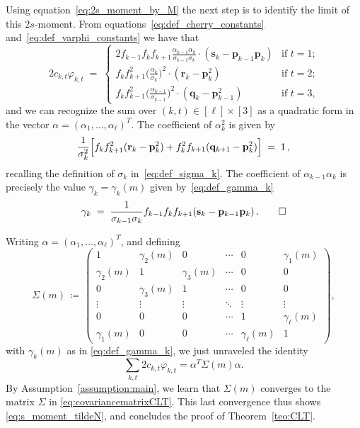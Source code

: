 \documentclass[reqno,a4paper,11pt]{amsart}
\theoremstyle{remark}
\newcommand{\mb}[1]{{\mathbf #1}}
\numberwithin{equation}{section}
\begin{document}
Using equation~\eqref{eq:2s_moment_by_M} the next step is to identify the limit of this $2s$-moment. From equations~\eqref{eq:def_cherry_constants}
and~\eqref{eq:def_varphi_constants} we have that 
%
\begin{equation}\label{eq:cktphikt}
2 c_{k,t} \varphi_{k,t}
    \;=\;
\begin{cases}
2 f_{k-1} f_k f_{k+1} \frac{\alpha_{k-1} \alpha_{k}}{\sigma_{k-1} \sigma_{k}}
    \cdot (\mb s_k - \mb p_{k-1} \mb p_k)
    &\text{if $t=1$;}\\
f_k f_{k+1}^2 \bigl(\frac{\alpha_{k}}{\sigma_{k}}\bigr)^2 \cdot
    (\mb r_k - \mb p_k^2)
    &\text{if $t=2$;}\\
f_k f_{k-1}^2 \bigl(\frac{\alpha_{k-1}}{\sigma_{k-1}}\bigr)^2 \cdot
    (\mb q_k - \mb p_{k-1}^2)
    &\text{if $t=3$,}
\end{cases}
\end{equation}
%
and we can recognize the sum over $(k,t) \in [\ell]\times [3]$ as a quadratic form
in the vector $\alpha = (\alpha_1, \ldots, \alpha_\ell)^T$. The coefficient of $\alpha_k^2$ is given by
\begin{equation*}
\frac{1}{\sigma_k^2} \Bigl[
    f_k   f_{k+1}^2 (\mb r_{k  } - \mb p_k^2) +
    f_k^2 f_{k+1}   (\mb q_{k+1} - \mb p_k^2)
    \Bigr] \;=\; 1\,,
\end{equation*}
recalling the definition of $\sigma_k$ in~\eqref{eq:def_sigma_k}.
The coefficient of $\alpha_{k-1} \alpha_{k}$ is precisely the value $\gamma_k=\gamma_k(m)$ given by~\eqref{eq:def_gamma_k}
\begin{equation*}
\gamma_{k}
    \;=\; \frac{1}{\sigma_{k-1} \sigma_k} f_{k-1} f_k f_{k+1}
    (\mb s_{k} - \mb p_{k-1} \mb p_k)\,.\qedhere
\end{equation*}

Writing $\alpha=(\alpha_1,\hdots, \alpha_\ell)^T$, and defining
%
$$
\Sigma(m) \, \coloneqq \, \left(
\begin{array}{cccccccc}
1 & \gamma_2(m) & 0 & \cdots  & 0 &\gamma_1(m)\\
\gamma_2(m) & 1 & \gamma_3(m) & \cdots & 0 & 0\\
0 & \gamma_3(m) & 1 & \cdots& 0 & 0\\
\vdots & \vdots & \vdots & \ddots & \vdots & \vdots\\
0 & 0 & 0 & \cdots & 1 & \gamma_{\ell}(m)\\
\gamma_1(m) & 0 & 0 & \cdots & \gamma_{\ell}(m) & 1
\end{array}\right),
$$
%
with $\gamma_k(m)$ as in \eqref{eq:def_gamma_k}, we just unraveled the identity
%
$$
\sum_{k,t} 2c_{k,t} \varphi_{k,t} = \alpha^T\Sigma(m)\alpha.
$$
%
By Assumption~\ref{assumption:main}, we learn that $\Sigma(m)$ converges to the matrix $\Sigma$ in \eqref{eq:covariancematrixCLT}. This last convergence thus shows \eqref{eq:s_moment_tildeN}, and concludes the proof of Theorem~\ref{teo:CLT}.
\end{document}
